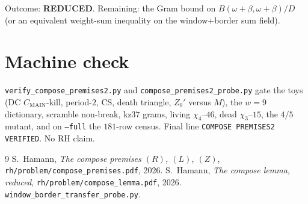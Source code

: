 \documentclass[11pt]{article}
\theoremstyle{remark}
\begin{document}
\noindent
Outcome: \textbf{REDUCED}.  Remaining: the Gram bound on
$B(\omega+\beta,\omega+\beta)/D$ (or an equivalent weight-sum
inequality on the window$+$border sum field).

\section{Machine check}\label{sec:machine}

\texttt{verify\_compose\_premises2.py} and
\texttt{compose\_premises2\_probe.py} gate the toys (DC
$C_{\mathrm{MAIN}}$-kill, period-$2$, CS, death triangle,
$Z_0'$ versus $M$), the $w=9$ dictionary, scramble non-break,
kz$37$ grams, living $\chi_4$--$46$, dead $\chi_3$--$15$,
the $4/5$ mutant, and on \texttt{--full} the $181$-row
census.  Final line \texttt{COMPOSE PREMISES2 VERIFIED}.
No RH claim.

\begin{thebibliography}{9}
 S.~Hamann,
\textit{The compose premises $(R)$, $(L)$, $(Z)$},
\texttt{rh/problem/compose\_premises.pdf}, 2026.
 S.~Hamann,
\textit{The compose lemma, reduced},
\texttt{rh/problem/compose\_lemma.pdf}, 2026.
 \texttt{window\_border\_transfer\_probe.py}.
\end{thebibliography}
\end{document}
